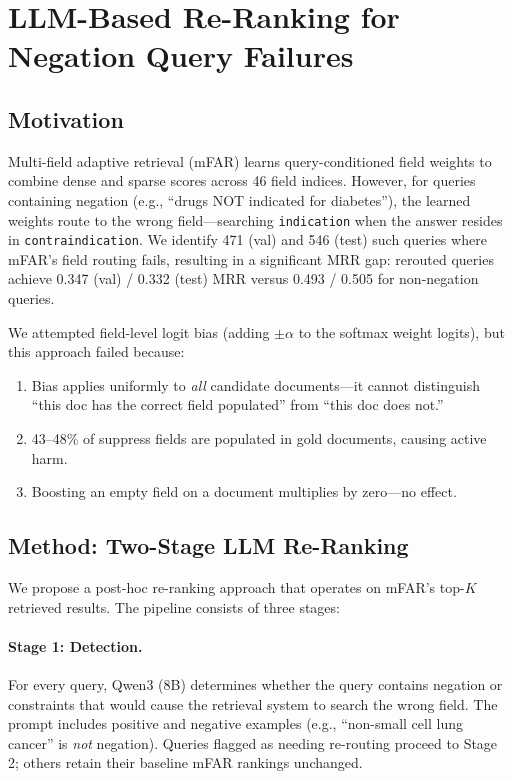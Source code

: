 \section{LLM-Based Re-Ranking for Negation Query Failures}

\subsection{Motivation}

Multi-field adaptive retrieval (mFAR) learns query-conditioned field weights to combine dense and sparse scores across 46 field indices. However, for queries containing negation (e.g., ``drugs NOT indicated for diabetes''), the learned weights route to the wrong field---searching \texttt{indication} when the answer resides in \texttt{contraindication}. We identify 471 (val) and 546 (test) such queries where mFAR's field routing fails, resulting in a significant MRR gap: rerouted queries achieve 0.347 (val) / 0.332 (test) MRR versus 0.493 / 0.505 for non-negation queries.

We attempted field-level logit bias (adding $\pm\alpha$ to the softmax weight logits), but this approach failed because:
\begin{enumerate}
    \item Bias applies uniformly to \emph{all} candidate documents---it cannot distinguish ``this doc has the correct field populated'' from ``this doc does not.''
    \item 43--48\% of suppress fields are populated in gold documents, causing active harm.
    \item Boosting an empty field on a document multiplies by zero---no effect.
\end{enumerate}

\subsection{Method: Two-Stage LLM Re-Ranking}

We propose a post-hoc re-ranking approach that operates on mFAR's top-$K$ retrieved results. The pipeline consists of three stages:

\paragraph{Stage 1: Detection.} For every query, Qwen3 (8B) determines whether the query contains negation or constraints that would cause the retrieval system to search the wrong field. The prompt includes positive and negative examples (e.g., ``non-small cell lung cancer'' is \emph{not} negation). Queries flagged as needing re-routing proceed to Stage 2; others retain their baseline mFAR rankings unchanged.

